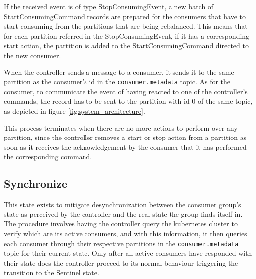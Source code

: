 If the received event is of type StopConsumingEvent, a new batch of
StartConsumingCommand records are prepared for the consumers that have to start
consuming from the partitions that are being rebalanced. This means that for
each partition referred in the StopConsumingEvent, if it has a corresponding
start action, the partition is added to the StartConsumingCommand directed to
the new consumer. 

When the controller sends a message to a consumer, it sends it to the same
partition as the consumer's id in the \lstinline{consumer.metadata} topic. As for
the consumer, to communicate the event of having reacted to one of the
controller's commands, the record has to be sent to the partition with id $0$ of
the same topic, as depicted in figure \ref{fig:system_architecture}.

This process terminates when there are no more actions to perform over any
partition, since the controller removes a start or stop action from a partition
as soon as it receives the acknowledgement by the consumer that it has performed
the corresponding command.

\subsection{Synchronize}

This state exists to mitigate desynchronization between the consumer group's
state as perceived by the controller and the real state the group finds itself
in. The procedure involves having the controller query the kubernetes cluster to
verify which are its active consumers, and with this information, it then
queries each consumer through their respective partitions in the
\lstinline{consumer.metadata} topic for their current state.  Only after all
active consumers have responded with their state does the controller proceed to
its normal behaviour triggering the transition to the Sentinel state. 
